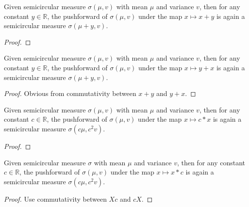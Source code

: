 
\begin{lemma}\label{lem:semicircleReal_map_add_const}
  \notready
  Given semicircular measure $\sigma(\mu, v)$ with mean $\mu$ and variance $v$, then for any constant $y \in \mathbb{R}$, the pushforward
  of $\sigma(\mu, v)$ under the map $x \mapsto x + y$ is again a semicircular measure $\sigma(\mu + y, v)$. 
  \begin{proof}
  \end{proof}
\end{lemma}


\begin{lemma}\label{lem:semicircleReal_map_const_add}
  \mathlibok
  Given semicircular measure $\sigma(\mu, v)$ with mean $\mu$ and variance $v$, then for any constant $y \in \mathbb{R}$, the pushforward
  of $\sigma(\mu, v)$ under the map $x \mapsto y + x$ is again a semicircular measure $\sigma(\mu + y, v)$. 
  \begin{proof}
    Obvious from commutativity between $x + y$ and $y + x$.
  \end{proof}
\end{lemma}


\begin{lemma}\label{lem:semicircleReal_map_const_mul}
  \notready
    Given semicircular measure $\sigma(\mu, v)$ with mean $\mu$ and variance $v$, then for any constant $c \in \mathbb{R}$, the pushforward
  of $\sigma(\mu, v)$ under the map $x \mapsto c * x$ is again a semicircular measure $\sigma(c\mu, c^2v)$. 
  \begin{proof}
  \end{proof}
\end{lemma}



\begin{lemma}\label{lem:semicircleReal_map_mul_const}
  \mathlibok
   Given semicircular measure $\sigma$ with mean $\mu$ and variance $v$, then for any constant $c \in \mathbb{R}$, the pushforward
  of $\sigma(\mu, v)$ under the map $x \mapsto x * c$ is again a semicircular measure $\sigma(c\mu, c^2v)$. 
  \begin{proof}
    Use commutativity between $Xc$ and $cX$.
  \end{proof}
\end{lemma}



